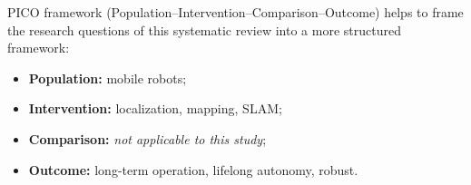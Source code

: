 PICO framework (Population--Intervention--Comparison--Outcome) helps to frame the research questions of this systematic review into a more structured framework:

\begin{itemize}[nosep]
\item \textbf{Population:} mobile robots;
\item \textbf{Intervention:} localization, mapping, SLAM;
\item \textbf{Comparison:} \textit{not applicable to this study};
\item \textbf{Outcome:} long-term operation, lifelong autonomy, robust.
\end{itemize}

